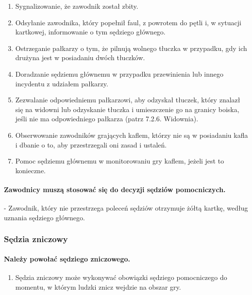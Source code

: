 \documentclass[12pt]{article}
\newcommand\yellowcard{\bgroup\color{yellow}\markoverwith{\textcolor{yellow}{\rule[-0.5ex]{2pt}{0.4pt}}}\ULon}
\begin{document}
\begin{enumerate}
	\item Sygnalizowanie, że zawodnik został zbity.

	\item Odsyłanie zawodnika, który popełnił faul, z powrotem do pętli i, w
	      sytuacji kartkowej, informowanie o tym sędziego głównego.

	\item Ostrzeganie pałkarzy o tym, że pilnują wolnego tłuczka w przypadku,
	      gdy ich drużyna jest w posiadaniu dwóch tłuczków.

	\item Doradzanie sędziemu głównemu w przypadku przewinienia lub innego
	      incydentu z udziałem pałkarzy.

	\item Zezwalanie odpowiedniemu pałkarzowi, aby odzyskał tłuczek, który
	      znalazł się na widowni lub odzyskanie tłuczka i umieszczenie go na
	      granicy boiska, jeśli nie ma odpowiedniego pałkarza (patrz 7.2.6.
	      Widownia).

	\item Obserwowanie zawodników grających kaflem, którzy nie są w posiadaniu
	      kafla i dbanie o to, aby przestrzegali oni zasad i ustaleń.

	\item Pomoc sędziemu głównemu w monitorowaniu gry kaflem, jeżeli jest to
	      konieczne.
\end{enumerate}

\paragraph{Zawodnicy muszą stosować się do decyzji sędziów
	pomocniczych.}

\yellowcard{Żółta kartka} - Zawodnik, który nie przestrzega poleceń sędziów
otrzymuje żółtą kartkę, według uznania sędziego głównego.

\subsubsection{Sędzia zniczowy}

\paragraph{Należy powołać sędziego zniczowego.}

\begin{enumerate}
	\item
	      Sędzia zniczowy może wykonywać obowiązki sędziego pomocniczego do
	      momentu, w którym ludzki znicz wejdzie na obszar gry.
\end{enumerate}
\end{document}
